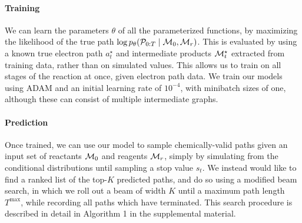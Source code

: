 \paragraph{Training}
We can learn the parameters $\theta$ of all the parameterized functions, by maximizing the likelihood of the true path $\log p_\theta({\mathcal{P}}_{0:T} \mid {\mathcal{M}}_0, {\mathcal{M}}_r)$.
This is evaluated by using a known true electron path $a_t^\star$ and intermediate products ${\mathcal{M}}_t^\star$ extracted from training data,
rather than on simulated values. 
This allows us to train on all stages of the reaction at once, given electron path data.
We train our models using ADAM \citep{kingma2014adam} and an initial learning rate of $10^{-4}$,
with minibatch sizes of one, although these can consist of multiple intermediate graphs.

\paragraph{Prediction}
Once trained, we can use our model to sample chemically-valid paths given an input set of reactants ${\mathcal{M}}_0$ and reagents ${\mathcal{M}}_r$, 
simply by simulating from the conditional distributions until sampling a stop value $s_t$.
We instead would like to find a ranked list of the top-$K$ predicted paths, and do so using a modified beam search,
in which we roll out a beam of width $K$ until a maximum path length $T^\mathrm{max}$,
while recording all paths which have terminated.
This search procedure is described in detail in Algorithm 1 in the supplemental material.



